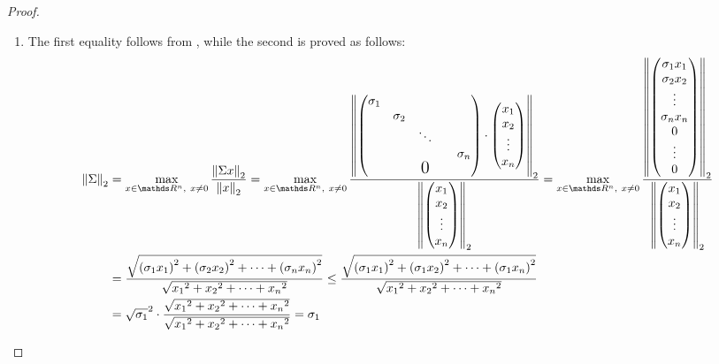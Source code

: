 \documentclass[computational_mathematics.tex]{subfiles}
\begin{document}
\begin{proof}
  \begin{enumerate}
    \item The first equality follows from , while the second is proved as follows:
  \begin{equation}
    \begin{split}
      \norm{\Sigma}_2 &=
    \max\limits_{x \in \R^n,~x \neq 0}\frac{\norm{\Sigma x}_2}{\norm{x}_2} =
    \max\limits_{x \in \R^n,~x \neq 0}\frac{\norm{\begin{pmatrix}
    \sigma_1\\
    & \sigma_2\\
    && \ddots\\
    &&&& \sigma_n\\
      &&\text{\Large 0}&&\\
    \end{pmatrix}
    \cdot 
    \begin{pmatrix}
      x_1\\
      x_2\\
      \vdots\\
      x_n\\
    \end{pmatrix}}_2}
      {\norm{\begin{pmatrix}
      x_1\\
      x_2\\
      \vdots\\
      x_n\\
    \end{pmatrix}}_2}
    =
      \max\limits_{x \in \R^n,~x \neq 0}\frac{\norm{\begin{pmatrix}
      \sigma_1 x_1\\
      \sigma_2 x_2\\
      \vdots\\
      \sigma_n x_n\\
      0\\
      \vdots\\
      0\\
      \end{pmatrix}}_2}
      {\norm{\begin{pmatrix}
      x_1\\
      x_2\\
      \vdots\\
      x_n\\
      \end{pmatrix}}_2}\\
      &=
    \frac{\sqrt{{(\sigma_1 x_1)}^2 + {(\sigma_2 x_2)}^2 + \cdots +{(\sigma_n x_n)}^2}}{\sqrt{{x_1}^2 + {x_2}^2 + \cdots +{x_n}^2}}
      \le 
      \frac{\sqrt{{(\sigma_1 x_1)}^2 + {(\sigma_1 x_2)}^2 + \cdots +{(\sigma_1 x_n)}^2}}{\sqrt{{x_1}^2 + {x_2}^2 + \cdots +{x_n}^2}}\\
      &=
    \sqrt{\sigma_1}^2 \cdot \frac{\sqrt{{x_1}^2 + {x_2}^2 + \cdots +{x_n}^2}}{\sqrt{{x_1}^2 + {x_2}^2 + \cdots +{x_n}^2}}
      = \sigma_1
  \end{split}
  \end{equation}


\end{enumerate}
\end{proof}
\end{document}
